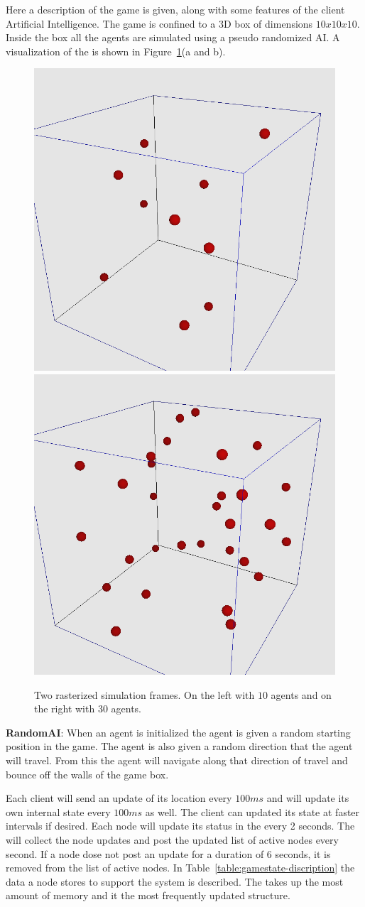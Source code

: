 Here a description of the game is given, along with some features of the client Artificial Intelligence. The game is confined to a 3D box of dimensions $10x10x10$. Inside the box all the agents are simulated using a pseudo randomized AI. A visualization of the \gamestate is shown in Figure~\ref{figure:game-renders}(a and b).

\begin{figure}[htb]
\centering
	\includegraphics[width=0.45\linewidth]{../images/10-agents-render.png}
	\includegraphics[width=0.45\linewidth]{../images/30-agents-render.png}	

	\caption{\label{figure:game-renders} Two rasterized simulation frames. On the left with $10$ agents and on the right with $30$ agents.}
\end{figure}

\noindent \textbf{RandomAI}: When an agent is initialized the agent is given a random starting position in the game. The agent is also given a random direction that the agent will travel. From this the agent will navigate along that direction of travel and bounce off the walls of the game box.

Each client will send an update of its location every $100ms$ and will update its own internal state every $100ms$ as well. The client can updated its state at faster intervals if desired. Each node will update its status in the \kvService every 2 seconds. The \activityServer will collect the node updates and post the updated list of active nodes every second. If a node dose not post an update for a duration of $6$ seconds, it is removed from the list of active nodes. In Table~\ref{table:gamestate-discription} the data a node stores to support the system is described. The \gamestate takes up the most amount of memory and it the most frequently updated structure.

